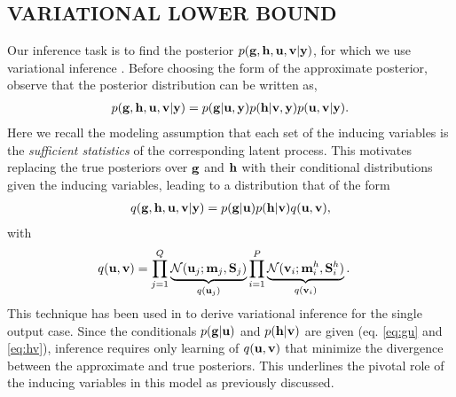 \subsection{VARIATIONAL LOWER BOUND \label{sec:variationalLowerBound}}
\newcommand{\ug}{\u_g}
\newcommand{\uh}{\u^h}
\newcommand{\mgj}{\m_j}
\newcommand{\mhi}{\m^h_i}
\newcommand{\Sgj}{\S_j}
\newcommand{\Shi}{\S^h_i}
Our inference task is to find the posterior $p(\mathbf{g}, \mathbf{h}, \mathbf{u}, \mathbf{v} | \mathbf{y})$, for which we use variational inference \citep{jordan-variational-99}. 
Before choosing the form of the approximate posterior, observe that the posterior distribution can be written as,
\begin{align}
p(\mathbf{g}, \mathbf{h}, \mathbf{u}, \mathbf{v} | \mathbf{y}) = p(\mathbf{g} | \mathbf{u}, \mathbf{y}) p(\mathbf{h} | \mathbf{v}, \mathbf{y}) p(\mathbf{u}, \mathbf{v} | \mathbf{y}).
\end{align}
Here we recall the modeling assumption that each set of the inducing variables is the \emph{sufficient statistics} of the corresponding latent process. 
This motivates replacing the true posteriors over $\mathbf{g}$ and $\mathbf{h}$ with their conditional distributions given the inducing variables, leading to a distribution that of the form
\begin{align}
q(\mathbf{g}, \mathbf{h}, \mathbf{u}, \mathbf{v} | \mathbf{y})
= p(\mathbf{g}|\mathbf{u}) p(\mathbf{h}|\mathbf{v}) q(\mathbf{u},\mathbf{v}),
\end{align}
with
\begin{align}
q(\u,\v) &= \prod_{j=1}^Q \underbrace{\Normal(\u_j; \mgj, \Sgj)}_{q(\u_j)} \prod_{i=1}^P  \underbrace{\Normal(\v_i; \mhi, \Shi)}_{q(\v_i)}.
\end{align}
This technique has been used in \citep{titsias2009variational,hensmangaussian} to derive variational inference for the single output case.
Since the conditionals $p(\mathbf{g} | \mathbf{u})$ and $p(\mathbf{h} | \mathbf{v})$ are given (eq. \ref{eq:gu} and \ref{eq:hv}), inference requires only learning of $q(\mathbf{u}, \mathbf{v})$ that minimize the divergence between the approximate and true posteriors.
This underlines the pivotal role of the inducing variables in this model as previously discussed.

